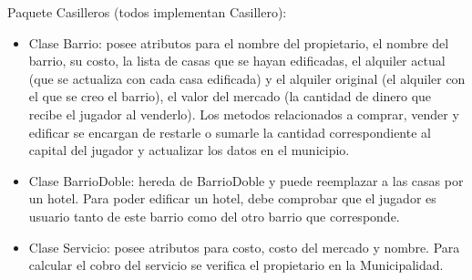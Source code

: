 \documentclass[titlepage,a4paper]{article}
\begin{document}
Paquete Casilleros (todos implementan Casillero):

\begin{itemize}
\item 
Clase Barrio: posee atributos para el nombre del propietario, el nombre del barrio, su costo, la lista de casas que se hayan edificadas, el alquiler actual (que se actualiza con cada casa edificada) y el alquiler original (el alquiler con el que se creo el barrio), el valor del mercado (la cantidad de dinero que recibe el jugador al venderlo). Los metodos relacionados a comprar, vender y edificar se encargan de restarle o sumarle la cantidad correspondiente al capital del jugador y actualizar los datos en el municipio.
\end{itemize}

\begin{itemize}
\item 
Clase BarrioDoble: hereda de BarrioDoble y puede reemplazar a las casas por un hotel. Para poder edificar un hotel, debe comprobar que el jugador es usuario tanto de este barrio como del otro barrio que corresponde.
\end{itemize}

\begin{itemize}
\item 
Clase Servicio: posee atributos para costo, costo del mercado y nombre. Para calcular el cobro del servicio se verifica el propietario en la Municipalidad.
\end{itemize}
\end{document}
